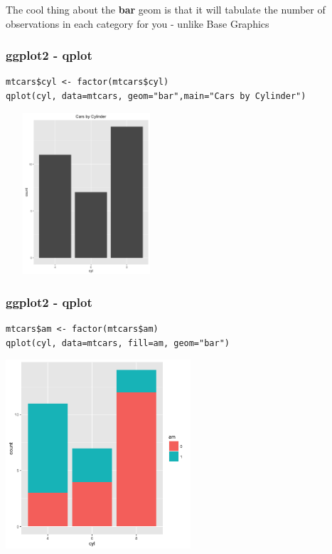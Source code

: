 \documentclass{beamer}
\begin{document}
\begin{frame}[fragile]

The cool thing about the \textbf{bar} geom is that it will tabulate the number of observations in each category for you - unlike Base Graphics
\frametitle{ggplot2 - qplot}
\scriptsize
\begin{verbatim}
mtcars$cyl <- factor(mtcars$cyl)
qplot(cyl, data=mtcars, geom="bar",main="Cars by Cylinder")
\end{verbatim}

\scriptsize
\begin{center}
\includegraphics[height=6cm,width=6cm]{../IMG/bar_cnt.png}
\end{center}
\end{frame}



\begin{frame}[fragile] 
\frametitle{ggplot2 - qplot}
\scriptsize
\begin{verbatim}
mtcars$am <- factor(mtcars$am)
qplot(cyl, data=mtcars, fill=am, geom="bar")
\end{verbatim}

\scriptsize
\begin{center}
\includegraphics[height=7cm]{../IMG/qplot_am.png}
\end{center}
\end{frame}
\end{document}
